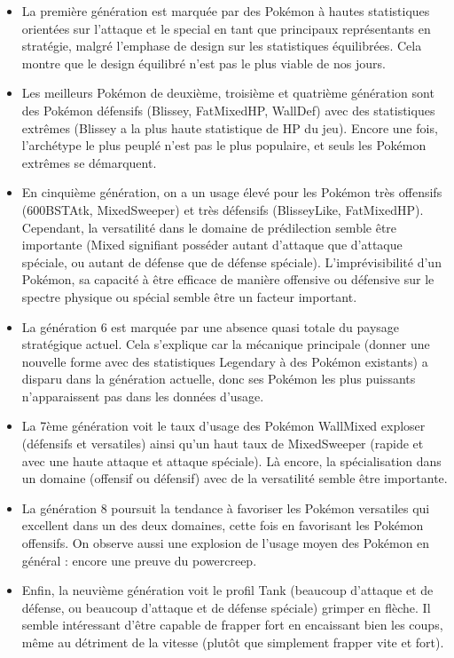 \documentclass[a4paper,12pt]{article}
\begin{document}
\begin{itemize}
    \item La première génération est marquée par des Pokémon à hautes statistiques orientées sur l'attaque et le special en tant que principaux représentants en stratégie, malgré l'emphase de design sur les statistiques équilibrées. Cela montre que le design équilibré n'est pas le plus viable de nos jours.
    \item Les meilleurs Pokémon de deuxième, troisième et quatrième génération sont des Pokémon défensifs (Blissey, FatMixedHP, WallDef) avec des statistiques extrêmes (Blissey a la plus haute statistique de HP du jeu). Encore une fois, l'archétype le plus peuplé n'est pas le plus populaire, et seuls les Pokémon extrêmes se démarquent.
    \item En cinquième génération, on a un usage élevé pour les Pokémon très offensifs (600BSTAtk, MixedSweeper) et très défensifs (BlisseyLike, FatMixedHP). Cependant, la versatilité dans le domaine de prédilection semble être importante (Mixed signifiant posséder autant d'attaque que d'attaque spéciale, ou autant de défense que de défense spéciale). L'imprévisibilité d'un Pokémon, sa capacité à être efficace de manière offensive ou défensive sur le spectre physique ou spécial semble être un facteur important.
    \item La génération 6 est marquée par une absence quasi totale du paysage stratégique actuel. Cela s'explique car la mécanique principale (donner une nouvelle forme avec des statistiques Legendary à des Pokémon existants) a disparu dans la génération actuelle, donc ses Pokémon les plus puissants n'apparaissent pas dans les données d'usage.
    \item La 7ème génération voit le taux d'usage des Pokémon WallMixed exploser (défensifs et versatiles) ainsi qu'un haut taux de MixedSweeper (rapide et avec une haute attaque et attaque spéciale). Là encore, la spécialisation dans un domaine (offensif ou défensif) avec de la versatilité semble être importante.
    \item La génération 8 poursuit la tendance à favoriser les Pokémon versatiles qui excellent dans un des deux domaines, cette fois en favorisant les Pokémon offensifs. On observe aussi une explosion de l'usage moyen des Pokémon en général : encore une preuve du powercreep.
    \item Enfin, la neuvième génération voit le profil Tank (beaucoup d'attaque et de défense, ou beaucoup d'attaque et de défense spéciale) grimper en flèche. Il semble intéressant d'être capable de frapper fort en encaissant bien les coups, même au détriment de la vitesse (plutôt que simplement frapper vite et fort).
    
\end{itemize}
\end{document}
